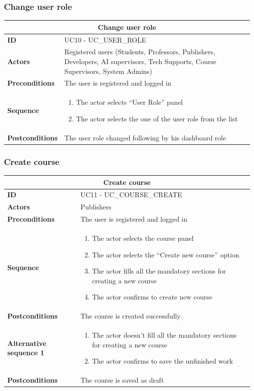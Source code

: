 \subsubsection{Change user role}
\begin{tabular}{|m{2.5cm}|m{8cm}|}
	\hline
	\multicolumn{2}{|c|}{Change user role} \\
	\hline
	\textbf{ID} & UC10 - UC\_USER\_ROLE \\
	\hline
	\textbf{Actors} & Registered users (Students, Professors, Publishers, Developers, AI supervisors, Tech Supports, Course Supervisors, System Admins) \\
	\hline
	\textbf{Preconditions} & The user is registered and logged in \\
	\hline
	\textbf{Sequence} & 
	\begin{enumerate}
		\item The actor selects “User Role” panel
		\item The actor selects the one of the user role from the list
	\end{enumerate} \\
	\hline
	\textbf{Postconditions} & The user role changed following by his dashboard role \\
	\hline
\end{tabular}

\subsubsection{Create course}
\begin{tabular}{|m{2.5cm}|m{8cm}|}
	\hline
	\multicolumn{2}{|c|}{Create course} \\
	\hline
	\textbf{ID} & UC11 - UC\_COURSE\_CREATE \\
	\hline
	\textbf{Actors} & Publishers \\
	\hline
	\textbf{Preconditions} & The user is registered and logged in \\
	\hline
	\textbf{Sequence} & 
	\begin{enumerate}
		\item The actor selects the course panel
		\item The actor selects the “Create new course” option
		\item The actor fills all the mandatory sections for creating a new course
		\item The actor confirms to create new course
	\end{enumerate} \\
	\hline
	\textbf{Postconditions} & The course is created successfully \\
	\hline
	
	\textbf{Alternative sequence 1} & 
	\begin{enumerate}
		\item The actor doesn’t fill all the mandatory sections for creating a new course
		\item The actor confirms to save the unfinished work
	\end{enumerate} \\
	\hline
	\textbf{Postconditions} & The course is saved as draft \\
	\hline
\end{tabular}

